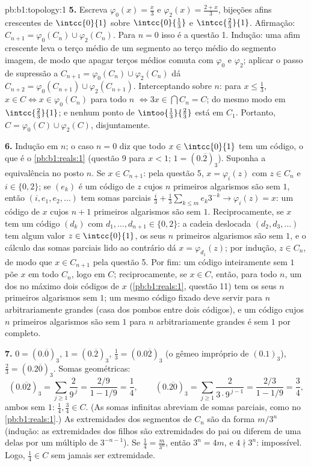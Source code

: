 \begin{solution}{pb:b1:topology:1}
\textbf{5.} Escreva $\varphi_0(x) = \frac x3$ e $\varphi_2(x) =
\frac{2 + x}{3}$, bijeções afins crescentes de $\intcc{0}{1}$
sobre $\intcc{0}{\frac13}$ e $\intcc{\frac23}{1}$. Afirmação:
$C_{n+1} = \varphi_0(C_n) \cup \varphi_2(C_n)$. Para $n = 0$ isso é
a questão 1. Indução: uma  afim crescente leva o
terço médio de um segmento ao terço médio do segmento imagem,
de modo que apagar terços médios comuta com $\varphi_0$ e
$\varphi_2$; aplicar o passo de supressão a $C_{n+1} =
\varphi_0(C_n) \cup \varphi_2(C_n)$ dá $C_{n+2} =
\varphi_0(C_{n+1}) \cup \varphi_2(C_{n+1})$. Interceptando sobre
$n$: para $x \leq \frac13$, $x \in C \iff x \in \varphi_0(C_n)$
para todo $n$ $\iff 3x \in \bigcap C_n = C$; do mesmo modo em
$\intcc{\frac23}{1}$; e nenhum ponto de $\intoo{\frac13}{\frac23}$
está em $C_1$. Portanto, $C = \varphi_0(C) \cup \varphi_2(C)$,
disjuntamente.

\textbf{6.} Indução em $n$; o caso $n = 0$ diz que todo $x \in
\intcc{0}{1}$ tem um código, o que é o \cref{pb:b1:reals:1}
(questão 9 para $x < 1$; $1 = (0.\overline 2)_3$). Suponha a
equivalência no posto $n$. Se $x \in C_{n+1}$: pela questão 5, $x =
\varphi_i(z)$ com $z \in C_n$ e $i \in \{0, 2\}$; se $(e_k)$
é um código de $z$ cujos $n$ primeiros algarismos são sem $1$, então $(i, e_1,
e_2, \dots)$ tem somas parciais $\frac i3 + \frac13\sum_{k\leq m}
e_k 3^{-k} \to \varphi_i(z) = x$: um código de $x$ cujos $n + 1$ primeiros
algarismos são sem $1$. Reciprocamente, se $x$ tem um código $(d_k)$ com
$d_1, \dots, d_{n+1} \in \{0, 2\}$: a cadeia deslocada $(d_2,
d_3, \dots)$ tem algum valor $z \in \intcc{0}{1}$, os seus $n$ primeiros
algarismos são sem $1$, e o cálculo das somas parciais lido
ao contrário dá $x = \varphi_{d_1}(z)$; por indução, $z \in
C_n$, de modo que $x \in C_{n+1}$ pela questão 5. Por fim: um código
inteiramente sem $1$ põe $x$ em todo $C_n$, logo em $C$; reciprocamente,
se $x \in C$, então, para todo $n$, um dos no máximo dois códigos de
$x$ (\cref{pb:b1:reals:1}, questão 11) tem os seus $n$ primeiros algarismos
sem $1$; um mesmo código fixado deve servir para $n$ arbitrariamente
grandes (casa dos pombos entre dois códigos), e um código cujos $n$
primeiros algarismos são sem $1$ para $n$ arbitrariamente grandes é
sem $1$ por completo.

\textbf{7.} $0 = (0.\overline 0)_3$, $1 = (0.\overline 2)_3$,
$\frac13 = (0.0\overline{2})_3$ (o gêmeo impróprio de $(0.1)_3$),
$\frac23 = (0.2\overline{0})_3$. Somas geométricas:
\[
(0.\overline{02})_3 = \sum_{j\geq1} \frac{2}{9^{\,j}}
= \frac{2/9}{1 - 1/9} = \frac14 ,
\qquad
(0.\overline{20})_3 = \sum_{j\geq1} \frac{2}{3\cdot 9^{\,j-1}}
= \frac{2/3}{1 - 1/9} = \frac34 ,
\]
ambos sem $1$: $\frac14, \frac34 \in C$. (As somas infinitas
abreviam  de somas parciais, como no \cref{pb:b1:reals:1}.)
As extremidades dos segmentos de $C_n$ são da forma $m/3^n$
(indução: as extremidades dos filhos são extremidades do pai ou
diferem de uma delas por um múltiplo de $3^{-n-1}$). Se $\frac14 =
\frac{m}{3^n}$, então $3^n = 4m$, e $4 \nmid 3^n$: impossível.
Logo, $\frac14 \in C$ sem jamais ser extremidade.


\end{solution}
